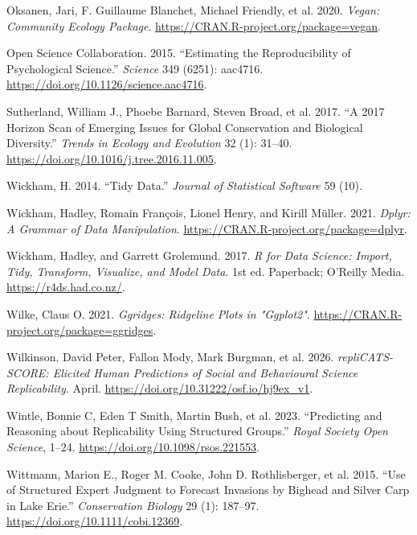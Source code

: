 \documentclass[
  11pt,
  a4paper,
]{article}
\newlength{\cslhangindent}
\newenvironment{CSLReferences}[2] %
 {\begin{list}{}{%
  \setlength{\itemindent}{0pt}
  \setlength{\leftmargin}{0pt}
  \setlength{\parsep}{0pt}
  \ifodd #1
   \setlength{\leftmargin}{\cslhangindent}
   \setlength{\itemindent}{-1\cslhangindent}
  \fi
  \setlength{\itemsep}{#2\baselineskip}}}
 {\end{list}}
\begin{document}
\begin{CSLReferences}{1}{1}
Oksanen, Jari, F. Guillaume Blanchet, Michael Friendly, et al. 2020.
\emph{Vegan: Community Ecology Package}.
\url{https://CRAN.R-project.org/package=vegan}.

Open Science Collaboration. 2015. {``Estimating the Reproducibility of
Psychological Science.''} \emph{Science} 349 (6251): aac4716.
\url{https://doi.org/10.1126/science.aac4716}.

Sutherland, William J., Phoebe Barnard, Steven Broad, et al. 2017. {``A
2017 Horizon Scan of Emerging Issues for Global Conservation and
Biological Diversity.''} \emph{Trends in Ecology and Evolution} 32 (1):
31--40. \url{https://doi.org/10.1016/j.tree.2016.11.005}.

Wickham, H. 2014. {``Tidy Data.''} \emph{Journal of Statistical
Software} 59 (10).

Wickham, Hadley, Romain François, Lionel Henry, and Kirill Müller. 2021.
\emph{Dplyr: A Grammar of Data Manipulation}.
\url{https://CRAN.R-project.org/package=dplyr}.

Wickham, Hadley, and Garrett Grolemund. 2017. \emph{R for Data Science:
Import, Tidy, Transform, Visualize, and Model Data}. 1st ed. Paperback;
O'Reilly Media. \url{https://r4ds.had.co.nz/}.

Wilke, Claus O. 2021. \emph{Ggridges: Ridgeline Plots in "Ggplot2"}.
\url{https://CRAN.R-project.org/package=ggridges}.

Wilkinson, David Peter, Fallon Mody, Mark Burgman, et al. 2026.
\emph{repliCATS-SCORE: Elicited Human Predictions of Social and
Behavioural Science Replicability}. April.
\url{https://doi.org/10.31222/osf.io/hj9ex_v1}.

Wintle, Bonnie C, Eden T Smith, Martin Bush, et al. 2023. {``Predicting
and Reasoning about Replicability Using Structured Groups.''}
\emph{Royal Society Open Science}, 1--24.
\url{https://doi.org/10.1098/rsos.221553}.

Wittmann, Marion E., Roger M. Cooke, John D. Rothlisberger, et al. 2015.
{``Use of Structured Expert Judgment to Forecast Invasions by Bighead
and Silver Carp in Lake Erie.''} \emph{Conservation Biology} 29 (1):
187--97. \url{https://doi.org/10.1111/cobi.12369}.

\end{CSLReferences}
\end{document}
